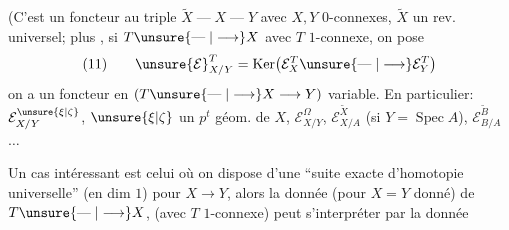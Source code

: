 
(C'est un foncteur  au triple $\widetilde X\mathrel{\text{---}}X\mathrel{\text{---}}Y$ avec $X,Y$ $0$-connexes, $\widetilde X$ un rev. universel; plus , si $T\unsure{\mathrel{\text{---}}|\longrightarrow}X$ avec $T$ $1$-connexe, on pose
\[
(11)\qquad \unsure{\mathcal E}_{X/Y}^{T}=\operatorname{Ker}\bigl(\mathcal E_X^{T}\unsure{\mathrel{\text{---}}|\longrightarrow}\mathcal E_Y^{T}\bigr)
\]
on a un foncteur en  $(T\unsure{\mathrel{\text{---}}|\longrightarrow}X\longrightarrow Y)$ variable. En particulier: $\mathcal E_{X/Y}^{\unsure{\xi|\zeta}}$, $\unsure{\xi|\zeta}$ un $p^t$ géom. de $X$, $\mathcal E_{X/Y}^{\Omega}$, $\mathcal E_{X/A}^{\widetilde X}$ (si $Y=\operatorname{Spec} A$), $\mathcal E_{B/A}^{\widetilde B}$ $\ldots$


Un cas intéressant est celui où on dispose d'une ``suite exacte d'homotopie universelle''  (en dim $1$) pour $X\longrightarrow Y$, alors la donnée (pour $X=Y$ donné) de $T\unsure{\mathrel{\text{---}}|\longrightarrow}X$, (avec $T$ $1$-connexe) peut s'interpréter par la donnée  

